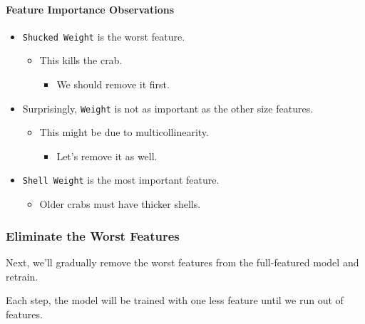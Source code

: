 \documentclass[11pt]{article}
\providecommand{\tightlist}{%
      \setlength{\itemsep}{0pt}\setlength{\parskip}{0pt}}
\begin{document}
    \paragraph{Feature Importance
Observations}\label{feature-importance-observations}

\begin{itemize}
\tightlist
\item
  \texttt{Shucked\ Weight} is the worst feature.

  \begin{itemize}
  \tightlist
  \item
    This kills the crab.

    \begin{itemize}
    \tightlist
    \item
      We should remove it first.
    \end{itemize}
  \end{itemize}
\item
  Surprisingly, \texttt{Weight} is not as important as the other size
  features.

  \begin{itemize}
  \tightlist
  \item
    This might be due to multicollinearity.

    \begin{itemize}
    \tightlist
    \item
      Let's remove it as well.
    \end{itemize}
  \end{itemize}
\item
  \texttt{Shell\ Weight} is the most important feature.

  \begin{itemize}
  \tightlist
  \item
    Older crabs must have thicker shells.
  \end{itemize}
\end{itemize}

    \subsubsection{Eliminate the Worst
Features}\label{eliminate-the-worst-features}

Next, we'll gradually remove the worst features from the full-featured
model and retrain.

Each step, the model will be trained with one less feature until we run
out of features.
\end{document}
